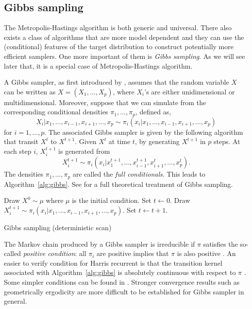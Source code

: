 \subsection{Gibbs sampling}
\label{sub:Gibbs sampling}

The Metropolis-Hastings algorithm is both generic and universal. There also
exists a class of \mcmc algorithms that are more model dependent and they can
use the (conditional) features of the target distribution to construct
potentially more efficient samplers. One more important of them is \emph{Gibbs
  sampling}. As we will see later that, it is a special case of
Metropolis-Hastings algorithm.

A Gibbs sampler, as first introduced by \cite{Geman:1993bp}, assumes that the
random variable $X$ can be written as $X = (X_1,\dots,X_p)$, where $X_i$'s are
either unidimensional or multidimensional. Moreover, suppose that we can
simulate from the corresponding conditional densities $\pi_1,\dots,\pi_p$,
defined as,
\begin{equation}
  X_i|x_1,\dots,x_{i-1},x_{i+1},\dots,x_p
  \sim \pi_i(x_i|x_1,\dots,x_{i-1},x_{i+1},\dots,x_p)
\end{equation}
for $i = 1,\dots,p$. The associated Gibbs sampler is given by the following
algorithm that transit $X^t$ to $X^{t+1}$. Given $X^t$ at time $t$, by
generating $X^{t+1}$ in $p$ steps. At each step $i$, $X_i^{t+1}$ is generated
from
\begin{equation}
  X_i^{t+1} \sim
  \pi_i(x_i|x_1^{t+1},\dots,x_{i-1}^{t+1},x_{i+1}^t,\dots,x_p^t).
\end{equation}
The densities $\pi_1,\dots,\pi_p$ are called the \emph{full conditionals}.
This leads to Algorithm~\ref{alg:gibbs}. See \cite[][chap.~8
and~9]{Robert:2004tn} for a full theoretical treatment of Gibbs sampling.

\begin{algorithm}
\begin{algorithmic}
  \tophrule
  \STATE Draw $X^0\sim\mu$ where $\mu$ is the initial condition.
  \STATE Set $t\leftarrow0$.
  \REPEAT
      \STATE Draw
      $X_i^{t+1}\sim\pi_i(x_i|x_1,\dots,x_{i-1},x_{i+1},\dots,x_p)$.
    \ENDFOR
    \STATE Set $t\leftarrow t+1$.
  \bottomhrule
\end{algorithmic}
\caption{Gibbs sampling (deterministic scan)}
\label{alg:gibbs}
\end{algorithm}

The Markov chain produced by a Gibbs sampler is irreducible if $\pi$ satisfies
the so-called \emph{positive condition}: all $\pi_i$ are positive implies that
$\pi$ is also positive \cite[][Theorem~10.8]{Robert:2004tn}. An easier to
verify condition for Harris recurrent is that the transition kernel associated
with Algorithm~\ref{alg:gibbs} is absolutely continuous with respect to $\pi$
\cite{Tierney:1994uk}. Some simpler conditions can be found in
\cite{Hobert:1997vx}. Stronger convergence results such as geometrically
ergodicity are more difficult to be established for Gibbs sampler in general.

